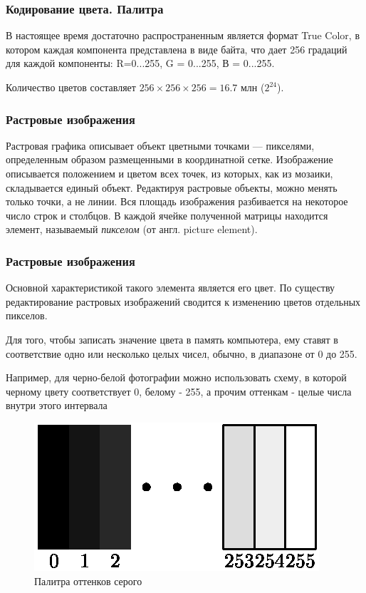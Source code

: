 \begin{frame}
\frametitle{Кодирование цвета. Палитра}

В настоящее время достаточно распространенным является формат True Color, в котором каждая компонента представлена в виде байта, что дает 256 градаций для каждой компоненты: R=0...255, G = 0...255, В = 0...255. 

Количество цветов составляет $256\times256\times256 = 16.7$ млн ($2^{24}$).
\end{frame}

\begin{frame}
\frametitle{Растровые изображения}

Растровая графика описывает объект цветными точками --- пикселями, определенным образом размещенными в координатной сетке.
Изображение описывается положением и цветом всех точек, из которых, как из мозаики, складывается единый объект.
Редактируя растровые объекты, можно менять только точки, а не линии.
Вся площадь изображения разбивается на некоторое число строк и столбцов. В каждой ячейке полученной матрицы находится элемент, называемый \textit{пикселом} (от англ. picture element).

\end{frame}

\begin{frame}
\frametitle{Растровые изображения}

Основной характеристикой такого элемента является его цвет. По существу редактирование растровых изображений сводится к изменению цветов отдельных пикселов. 

Для того, чтобы записать значение цвета в память компьютера, ему ставят в соответствие одно или несколько целых чисел, обычно, в диапазоне от 0 до 255.

Например, для черно-белой фотографии можно использовать схему, в которой черному цвету соответствует 0, белому - 255, а прочим оттенкам - целые числа внутри этого интервала 
\begin{figure}[htbp] \begin{center}
\includegraphics{images/part17}
\caption{Палитра оттенков серого}
\end{center} \end{figure}
\end{frame}



